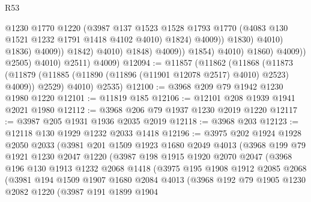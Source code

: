 \begin{lexlean}{R53}
\begin{coremodule}
                                              @1230
                                              @1770
                                              @1220
                                              (@3987
                                                @137
                                                @1523
                                                @1528
                                                @1793
                                                @1770
                                                (@4083 @130 @1521 @1232 @1791 @1418 @4102 @4010)
                                                @1824)
                                              @4009))
                                          @1830)
                                        @4010)
                                      @1836)
                                    @4009))
                                @1842)
                              @4010)
                            @1848)
                          @4009))
                      @1854)
                    @4010)
                  @1860)
                @4009))
            @2505)
          @4010)
        @2511)
      @4009)
@12094 := @11857
    (@11862
      (@11868
        (@11873 (@11879 (@11885 (@11890 (@11896 (@11901 @12078 @2517) @4010) @2523) @4009)) @2529)
        @4010)
      @2535)
@12100 := @3968 @209 @79 @1942 @1230 @1980 @1220
@12101 := @11819 @185
@12106 := @12101 @208 @1939 @1941 @2021 @1980
@12112 := @3968 @206 @79 @1937 @1230 @2019 @1220
@12117 := @3987 @205 @1931 @1936 @2035 @2019
@12118 := @3968 @203
@12123 := @12118 @130 @1929 @1232 @2033 @1418
@12196 := @3975
    @202
    @1924
    @1928
    @2050
    @2033
    (@3981
      @201
      @1509
      @1923
      @1680
      @2049
      @4013
      (@3968
        @199
        @79
        @1921
        @1230
        @2047
        @1220
        (@3987
          @198
          @1915
          @1920
          @2070
          @2047
          (@3968
            @196
            @130
            @1913
            @1232
            @2068
            @1418
            (@3975
              @195
              @1908
              @1912
              @2085
              @2068
              (@3981
                @194
                @1509
                @1907
                @1680
                @2084
                @4013
                (@3968
                  @192
                  @79
                  @1905
                  @1230
                  @2082
                  @1220
                  (@3987
                    @191
                    @1899
                    @1904

\end{coremodule}
\end{lexlean}
